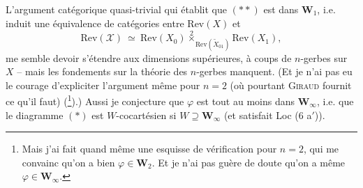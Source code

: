 L'argument catégorique quasi-trivial qui établit que $(**)$ est dans $\mathbf{W}_1$, i.e. induit une équivalence de catégories entre $\mathrm{Rev}(X)$ et
\[ \mathrm{Rev}(\mathcal{X}) \ \simeq \ \mathrm{Rev}(X_0) \overset{2}{\times}_{\mathrm{Rev}(\tilde{X}_{01})} \mathrm{Rev}(X_1), \]
me semble devoir s'étendre aux dimensions supérieures, à coups de $n$-gerbes sur $X$ -- mais les fondements sur la théorie des $n$-gerbes manquent. (Et je n'ai pas eu le courage d'expliciter l'argument même pour $n = 2$ (où pourtant \textsc{Giraud} fournit ce qu'il faut) (\footnote[10]{Mais j'ai fait quand même une esquisse de vérification pour $n = 2$, qui me convainc qu'on a bien $\varphi \in \mathbf{W}_2$. Et je n'ai pas guère de doute qu'on a même $\varphi \in \mathbf{W}_\infty$.}).) Aussi je conjecture que $\varphi$ est tout au moins dans $\mathbf{W}_\infty$, i.e. que le diagramme $(*)$ est $W$-cocartésien si $W \supseteq \mathbf{W}_\infty$ (et satisfait Loc (6 a$'$)). %


